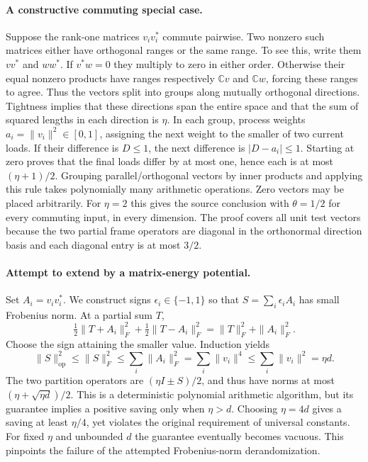 \documentclass[11pt]{article}
\begin{document}
\paragraph{A constructive commuting special case.}
Suppose the rank-one matrices $v_iv_i^*$ commute pairwise. Two nonzero such
matrices either have orthogonal ranges or the same range. To see this, write
them $vv^*$ and $ww^*$. If $v^*w=0$ they multiply to zero in either order.
Otherwise their equal nonzero products have ranges respectively $\mathbb Cv$
and $\mathbb Cw$, forcing these ranges to agree. Thus the vectors split
into groups along mutually orthogonal directions. Tightness implies that
these directions span the entire space and that the sum of squared lengths
in each direction is $\eta$.
In each group, process weights $a_i=\|v_i\|^2\in[0,1]$, assigning the next
weight to the smaller of two current loads. If their difference is $D\le1$,
the next difference is $|D-a_i|\le1$. Starting at zero proves that the final
loads differ by at most one, hence each is at most $(\eta+1)/2$.
Grouping parallel/orthogonal vectors by inner products and applying this rule
takes polynomially many arithmetic operations. Zero vectors may be placed
arbitrarily. For $\eta=2$ this gives the source conclusion with $\theta=1/2$
for every commuting input, in every dimension. The proof covers all unit test
vectors because the two partial frame operators are diagonal in the
orthonormal direction basis and each diagonal entry is at most $3/2$.

\paragraph{Attempt to extend by a matrix-energy potential.}
Set $A_i=v_iv_i^*$. We construct signs $\epsilon_i\in\{-1,1\}$ so that
$S=\sum_i\epsilon_iA_i$ has small Frobenius norm. At a partial sum $T$,
\[
\tfrac12\|T+A_i\|_F^2+\tfrac12\|T-A_i\|_F^2
=\|T\|_F^2+\|A_i\|_F^2.
\]
Choose the sign attaining the smaller value. Induction yields
\[
\|S\|_{\mathrm{op}}^2\le\|S\|_F^2
\le\sum_i\|A_i\|_F^2=\sum_i\|v_i\|^4
\le\sum_i\|v_i\|^2=\eta d.
\]
The two partition operators are $(\eta I\pm S)/2$, and thus have norms
at most $(\eta+\sqrt{\eta d})/2$. This is a deterministic polynomial
arithmetic algorithm, but its guarantee implies a positive saving only when
$\eta>d$. Choosing $\eta=4d$ gives a saving at least $\eta/4$, yet violates
the original requirement of universal constants. For fixed $\eta$ and
unbounded $d$ the guarantee eventually becomes vacuous. This pinpoints the
failure of the attempted Frobenius-norm derandomization.
\end{document}
